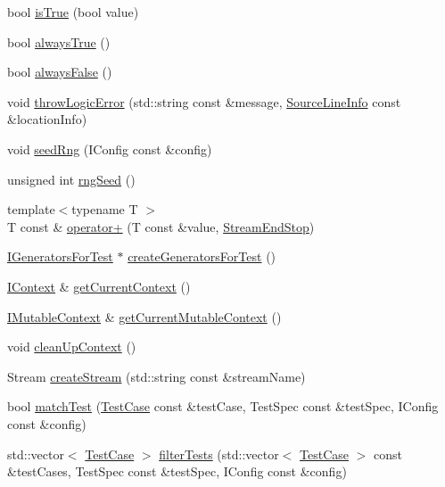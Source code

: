 \begin{DoxyCompactItemize}
\item 
bool \hyperlink{namespace_catch_ae3bc6c6677e64e6eaa720dc3add31852}{is\-True} (bool value)
\item 
bool \hyperlink{namespace_catch_a129be2186a2f6546206ec52c4bf2156f}{always\-True} ()
\item 
bool \hyperlink{namespace_catch_ad425271249dd02956a9709e78b8b2783}{always\-False} ()
\item 
void \hyperlink{namespace_catch_a702b612f683d154c466ea8297ed4a20d}{throw\-Logic\-Error} (std\-::string const \&message, \hyperlink{struct_catch_1_1_source_line_info}{Source\-Line\-Info} const \&location\-Info)
\item 
void \hyperlink{namespace_catch_a161400810eb0995394d6d8d3cae821ad}{seed\-Rng} (I\-Config const \&config)
\item 
unsigned int \hyperlink{namespace_catch_acf5ea05e942d2d7fe79111e12754ed76}{rng\-Seed} ()
\item 
{\footnotesize template$<$typename T $>$ }\\T const \& \hyperlink{namespace_catch_a5e95b3c47a7618db3649dc39b0bb9004}{operator+} (T const \&value, \hyperlink{struct_catch_1_1_stream_end_stop}{Stream\-End\-Stop})
\item 
\hyperlink{struct_catch_1_1_i_generators_for_test}{I\-Generators\-For\-Test} $\ast$ \hyperlink{namespace_catch_a3d93b31e88fd01ee9e0d20757ff64eab}{create\-Generators\-For\-Test} ()
\item 
\hyperlink{struct_catch_1_1_i_context}{I\-Context} \& \hyperlink{namespace_catch_ad517cca9b21deb79101e90e5508dd161}{get\-Current\-Context} ()
\item 
\hyperlink{struct_catch_1_1_i_mutable_context}{I\-Mutable\-Context} \& \hyperlink{namespace_catch_af7bb0c32ab2453d2f53e92a96d15360e}{get\-Current\-Mutable\-Context} ()
\item 
void \hyperlink{namespace_catch_ae50508f10ffc4ed873a31a4db4caea16}{clean\-Up\-Context} ()
\item 
Stream \hyperlink{namespace_catch_ad7591011c5d99d59504ecd3384001c3e}{create\-Stream} (std\-::string const \&stream\-Name)
\item 
bool \hyperlink{namespace_catch_aadef80fbc6bc84589777a462770cef49}{match\-Test} (\hyperlink{class_catch_1_1_test_case}{Test\-Case} const \&test\-Case, Test\-Spec const \&test\-Spec, I\-Config const \&config)
\item 
std\-::vector$<$ \hyperlink{class_catch_1_1_test_case}{Test\-Case} $>$ \hyperlink{namespace_catch_ab5da9aa67c42a3f626aea07d0b556829}{filter\-Tests} (std\-::vector$<$ \hyperlink{class_catch_1_1_test_case}{Test\-Case} $>$ const \&test\-Cases, Test\-Spec const \&test\-Spec, I\-Config const \&config)

\end{DoxyCompactItemize}
